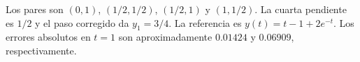 Los pares son \((0,1)\), \((1/2,1/2)\), \((1/2,1)\) y \((1,1/2)\). La cuarta pendiente es \(1/2\) y el paso corregido da \(y_1=3/4\). La referencia es \(y(t)=t-1+2e^{-t}\). Los errores absolutos en \(t=1\) son aproximadamente \(0.01424\) y \(0.06909\), respectivamente.
